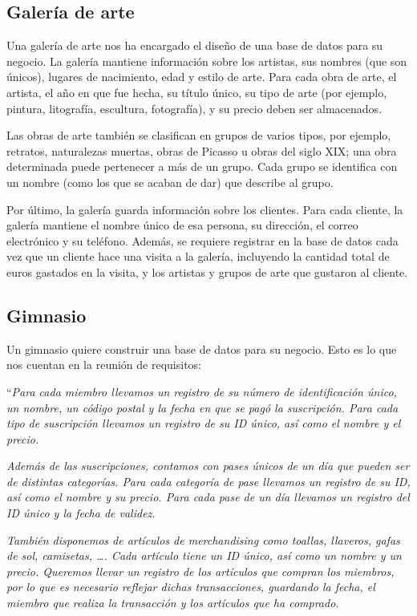 \documentclass{db-practice}
\begin{document}
\subsection{Galería de arte}
Una galería de arte nos ha encargado el diseño de una base de datos para su negocio. La galería mantiene información sobre los artistas, sus nombres (que son únicos), lugares de nacimiento, edad y estilo de arte. Para cada obra de arte, el artista, el año en que fue hecha, su título único, su tipo de arte (por ejemplo, pintura, litografía, escultura, fotografía), y su precio deben ser almacenados. 

Las obras de arte también se clasifican en grupos de varios tipos, por ejemplo, retratos, naturalezas muertas, obras de Picasso u obras del siglo XIX; una obra determinada puede pertenecer a más de un grupo. Cada grupo se identifica con un nombre (como los que se acaban de dar) que describe al grupo. 

Por último, la galería guarda información sobre los clientes. Para cada cliente, la galería mantiene el nombre único de esa persona, su dirección, el correo electrónico y su teléfono. Además, se requiere registrar en la base de datos cada vez que un cliente hace una visita a la galería, incluyendo la cantidad total de euros gastados en la visita, y los artistas y grupos de arte que gustaron al cliente.

\subsection{Gimnasio}
Un gimnasio quiere construir una base de datos para su negocio. Esto es lo que nos cuentan en la reunión de requisitos:

``\textit{Para cada miembro llevamos un registro de su número de identificación único, un nombre, un código postal y la fecha en que se pagó la suscripción. Para cada tipo de suscripción llevamos un registro de su ID único, así como el nombre y el precio.} 

\textit{Además de las suscripciones, contamos con pases únicos de un día que pueden ser de distintas categorías. Para cada categoría de pase llevamos un registro de su ID, así como el nombre y su precio. Para cada pase de un día llevamos un registro del ID único y la fecha de validez.}

\textit{También disponemos de artículos de merchandising como toallas, llaveros, gafas de sol, camisetas, \ldots. Cada artículo tiene un ID único, así como un nombre y un precio. Queremos llevar un registro de los artículos que compran los miembros, por lo que es necesario reflejar dichas transacciones, guardando la fecha, el miembro que realiza la transacción y los artículos que ha comprado.}
\end{document}
